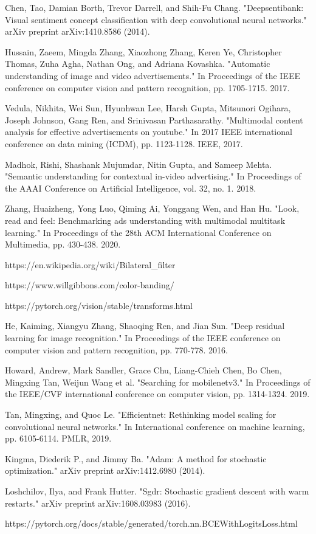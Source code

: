 \documentclass[conference]{IEEEtran}
\begin{document}
\begin{thebibliography}{00}
 Chen, Tao, Damian Borth, Trevor Darrell, and Shih-Fu Chang. "Deepsentibank: Visual sentiment concept classification with deep convolutional neural networks." arXiv preprint arXiv:1410.8586 (2014).

 Hussain, Zaeem, Mingda Zhang, Xiaozhong Zhang, Keren Ye, Christopher Thomas, Zuha Agha, Nathan Ong, and Adriana Kovashka. "Automatic understanding of image and video advertisements." In Proceedings of the IEEE conference on computer vision and pattern recognition, pp. 1705-1715. 2017.

 Vedula, Nikhita, Wei Sun, Hyunhwan Lee, Harsh Gupta, Mitsunori Ogihara, Joseph Johnson, Gang Ren, and Srinivasan Parthasarathy. "Multimodal content analysis for effective advertisements on youtube." In 2017 IEEE international conference on data mining (ICDM), pp. 1123-1128. IEEE, 2017.

 Madhok, Rishi, Shashank Mujumdar, Nitin Gupta, and Sameep Mehta. "Semantic understanding for contextual in-video advertising." In Proceedings of the AAAI Conference on Artificial Intelligence, vol. 32, no. 1. 2018.

 Zhang, Huaizheng, Yong Luo, Qiming Ai, Yonggang Wen, and Han Hu. "Look, read and feel: Benchmarking ads understanding with multimodal multitask learning." In Proceedings of the 28th ACM International Conference on Multimedia, pp. 430-438. 2020.

 https://en.wikipedia.org/wiki/Bilateral\_filter

 https://www.willgibbons.com/color-banding/

 https://pytorch.org/vision/stable/transforms.html

 He, Kaiming, Xiangyu Zhang, Shaoqing Ren, and Jian Sun. "Deep residual learning for image recognition." In Proceedings of the IEEE conference on computer vision and pattern recognition, pp. 770-778. 2016.

 Howard, Andrew, Mark Sandler, Grace Chu, Liang-Chieh Chen, Bo Chen, Mingxing Tan, Weijun Wang et al. "Searching for mobilenetv3." In Proceedings of the IEEE/CVF international conference on computer vision, pp. 1314-1324. 2019.

 Tan, Mingxing, and Quoc Le. "Efficientnet: Rethinking model scaling for convolutional neural networks." In International conference on machine learning, pp. 6105-6114. PMLR, 2019.

 Kingma, Diederik P., and Jimmy Ba. "Adam: A method for stochastic optimization." arXiv preprint arXiv:1412.6980 (2014).

 Loshchilov, Ilya, and Frank Hutter. "Sgdr: Stochastic gradient descent with warm restarts." arXiv preprint arXiv:1608.03983 (2016).

 https://pytorch.org/docs/stable/generated/torch.nn.BCEWithLogitsLoss.html

\end{thebibliography}
\end{document}

